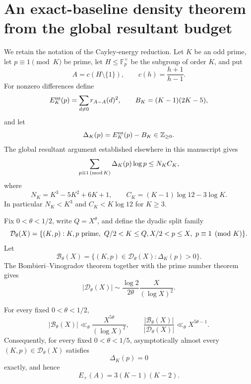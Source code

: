 
\section{An exact-baseline density theorem from the global resultant budget}
\label{sec:exact-baseline-density}

We retain the notation of the Cayley-energy reduction.  Let $K$ be an odd
prime, let $p\equiv1\pmod K$ be prime, let $H\leq\mathbb F_p^\times$ be the
subgroup of order $K$, and put
\[
 A=c(H\setminus\{1\}),\qquad c(h)=\frac{h+1}{h-1}.
\]
For nonzero differences define
\[
 E_K^{\rm nz}(p)=\sum_{d\ne0}r_{A-A}(d)^2,
 \qquad
 B_K=(K-1)(2K-5),
\]
and let
\[
 \Delta_K(p)=E_K^{\rm nz}(p)-B_K\in\mathbb Z_{\ge0}.
\]
The global resultant argument established elsewhere in this manuscript gives
\begin{equation}
 \sum_{p\equiv1\,({\rm mod}\,K)}\Delta_K(p)\log p
 \le N_K C_K,
 \label{eq:global-resultant-budget-addendum}
\end{equation}
where
\[
 N_K=K^3-5K^2+6K+1,
 \qquad
 C_K=(K-1)\log 12-3\log K.
\]
In particular $N_K<K^3$ and $C_K<K\log12$ for $K\ge3$.

Fix $0<\theta<1/2$, write $Q=X^\theta$, and define the dyadic split family
\[
 \mathcal D_\theta(X)=\{(K,p):K,p\ {\rm prime},\ Q/2<K\le Q,
 X/2<p\le X,\ p\equiv1\pmod K\}.
\]
Let
\[
 \mathcal B_\theta(X)=\{(K,p)\in\mathcal D_\theta(X):\Delta_K(p)>0\}.
\]
The Bombieri--Vinogradov theorem together with the prime number theorem gives
\begin{equation}
 |\mathcal D_\theta(X)|\sim
 \frac{\log2}{2\theta}\frac{X}{(\log X)^2}.
 \label{eq:dyadic-design-count-addendum}
\end{equation}

\begin{theorem}
\label{thm:exact-baseline-density}
For every fixed $0<\theta<1/2$,
\[
 |\mathcal B_\theta(X)|
 \ll_\theta \frac{X^{5\theta}}{(\log X)^2},
 \qquad
 \frac{|\mathcal B_\theta(X)|}{|\mathcal D_\theta(X)|}
 \ll_\theta X^{5\theta-1}.
\]
Consequently, for every fixed $0<\theta<1/5$, asymptotically almost every
$(K,p)\in\mathcal D_\theta(X)$ satisfies
\[
 \Delta_K(p)=0
\]
exactly, and hence
\[
 E_+(A)=3(K-1)(K-2).
\]
\end{theorem}

